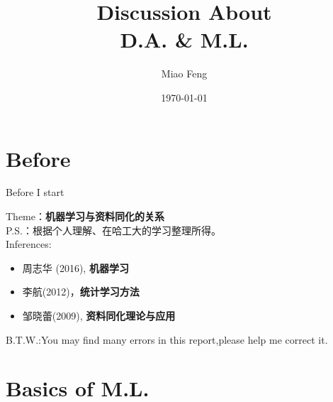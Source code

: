 \documentclass{beamer}
\title%
{Discussion About \\ D.A. \&  M.L.}
\author%
{Miao Feng}
\date%
{\today}
\begin{document}

\begin{frame}
  \titlepage
\end{frame}

\section*{Before}
\begin{frame}{Before I start}

  Theme：\textbf{机器学习与资料同化的关系}\\
  P.S.：根据个人理解、在哈工大的学习整理所得。\\
  Inferences: \\
\footnotesize{
\begin{itemize}
  \item
	\begin{thebibliography}{99}
	 周志华 (2016), \textbf{机器学习}
	\end{thebibliography}
  \item
	\begin{thebibliography}{99} 
	 李航(2012)，\textbf{统计学习方法}
	\end{thebibliography}
  \item
	\begin{thebibliography}{99} 
	 邹晓蕾(2009), \textbf{资料同化理论与应用}
	\end{thebibliography}
\end{itemize}
}
B.T.W.:You may find many errors in this report,please help me correct it.
\end{frame}

\section{Basics of M.L. }
\end{document}
